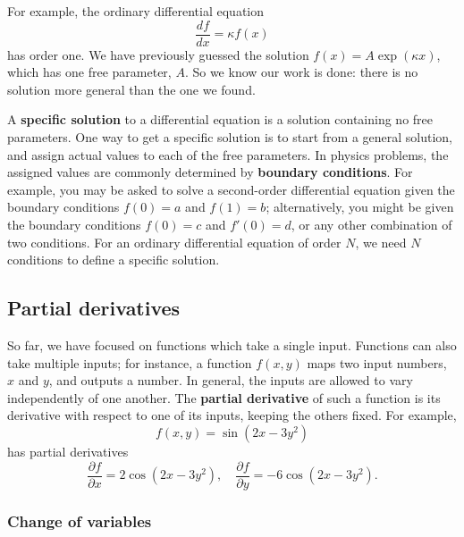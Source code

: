 \documentclass[10pt,a4paper]{article}
\begin{document}
For example, the ordinary differential equation
\begin{equation}
\frac{df}{dx} = \kappa f(x)
\end{equation}
has order one. We have previously guessed the solution
$f(x) = A \exp(\kappa x)$, which has one free parameter, $A$. So we know
our work is done: there is no solution more general than the one we
found.

A \textbf{specific solution} to a differential equation is a solution
containing no free parameters. One way to get a specific solution is to
start from a general solution, and assign actual values to each of the
free parameters. In physics problems, the assigned values are commonly
determined by \textbf{boundary conditions}. For example, you may be
asked to solve a second-order differential equation given the boundary
conditions $f(0) = a$ and $f(1) = b$; alternatively, you might be
given the boundary conditions $f(0) = c$ and $f'(0) = d$, or any
other combination of two conditions. For an ordinary differential
equation of order $N$, we need $N$ conditions to define a specific
solution.

    \hypertarget{partial-derivatives}{%
\subsection{Partial derivatives}\label{partial-derivatives}}

So far, we have focused on functions which take a single input.
Functions can also take multiple inputs; for instance, a function
$f(x,y)$ maps two input numbers, $x$ and $y$, and outputs a
number. In general, the inputs are allowed to vary independently of one
another. The \textbf{partial derivative} of such a function is its
derivative with respect to one of its inputs, keeping the others fixed.
For example,
\begin{equation}
f(x,y) = \sin(2x - 3 y^2)
\end{equation}
has partial derivatives
\begin{equation}
\frac{\partial f}{\partial x} = 2\cos(2x-3y^2), \quad \frac{\partial f}{\partial y} = - 6\cos(2x-3y^2).
\end{equation}
    \hypertarget{change-of-variables}{%
\subsubsection{Change of variables}\label{change-of-variables}}
\end{document}
